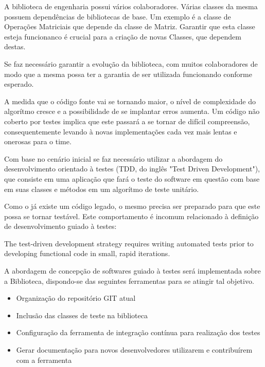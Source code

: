 \documentclass[
	article,			%
	12pt,				%
	oneside,			%
	a4paper,			%
	english,			
	brazil,
	sumario=tradicional
	]{abntex2}
\begin{document}
A biblioteca de engenharia possui vários colaboradores. Várias classes da mesma possuem dependências de bibliotecas de base. Um exemplo é a classe de Operações Matriciais que depende da classe de Matriz. Garantir que esta classe esteja funcionanco é crucial para a criação de novas Classes, que dependem destas.

Se faz necessário garantir a evolução da biblioteca, com muitos colaboradores de modo que a mesma possa ter a garantia de ser utilizada funcionando conforme esperado.

A medida que o código fonte vai se tornando maior, o nível de complexidade do algorítmo cresce e a possibilidade de se implantar erros aumenta. Um código não coberto por testes implica que este passará a se tornar de difícil compreensão, consequentemente levando à novas implementações cada vez mais lentas e onerosas para o time.

Com base no cenário inicial se faz necessário utilizar a abordagem do desenvolvimento orientado à testes (TDD, do inglês "Test Driven Development"), que consiste em uma aplicação que fará o teste do software em questão com base em suas classes e métodos em um algorítmo de teste unitário.

Como o já existe um código legado, o mesmo precisa ser preparado para que este possa se tornar testável. Este comportamento é incomum relacionado à definição de desenvolvimento guiado à testes:

\begin{citacao}
The test-driven development strategy 
requires writing automated tests prior to 
developing functional code in small, rapid 
iterations.
	\cite[Introduction]{testdrivendevelopment.1}
\end{citacao}

A abordagem de concepção de softwares guiado à testes será implementada sobre a Biblioteca, dispondo-se das seguintes ferramentas para se atingir tal objetivo.

\begin{itemize}
	\item{Organização do repositório GIT atual}
	\item{Inclusão das classes de teste na biblioteca}
	\item{Configuração da ferramenta de integração contínua para realização dos testes}
	\item{Gerar documentação para novos desenvolvedores utilizarem e contribuírem com a ferramenta}
\end{itemize}
\end{document}
